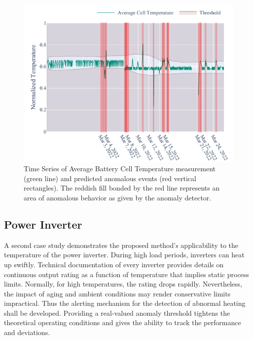 \begin{figure}[htbp]
\centerline{\includegraphics{figures/Average_Cell_Temperature_168_hours_sliding_thresh.pdf}}
\caption{Time Series of Average Battery Cell Temperature measurement (green line) and predicted anomalous events (red vertical rectangles). The reddish fill bonded by the red line represents an area of anomalous behavior as given by the anomaly detector.}
\label{fig:threshold}
\end{figure}

\subsection{Power Inverter}\label{AA:Case2}
A second case study demonstrates the  proposed method's applicability to the temperature of the power inverter. During high load periods, inverters can heat up swiftly. Technical documentation of every inverter provides details on continuous output rating as a function of temperature that implies static process limits. Normally, for high temperatures, the rating drops rapidly. Nevertheless, the impact of aging and ambient conditions may render conservative limits impractical. Thus the alerting mechanism for the detection of abnormal heating shall be developed. Providing a real-valued anomaly threshold tightens the theoretical operating conditions and gives the ability to track the performance and deviations. 


